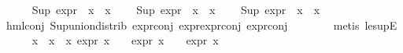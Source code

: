 \begin{isabellebody}
\ \ \ \ \isamarkupfalse%
\ {\isachardoublequoteopen}{\isacharparenleft}{\kern0pt}Sup\ {\isacharparenleft}{\kern0pt}{\isacharparenleft}{\kern0pt}expr{\isacharunderscore}{\kern0pt}{}\ {\isasymcirc}\ x{}{}{\isacharparenright}{\kern0pt}\ {\isacharbackquote}{\kern0pt}\ x{}{}{\isacharparenright}{\kern0pt}\ {\isasymle}\ {}{\isacharparenright}{\kern0pt}{\isachardoublequoteclose}\isanewline
\ \ {\isachardoublequoteopen}{\isacharparenleft}{\kern0pt}Sup\ {\isacharparenleft}{\kern0pt}{\isacharparenleft}{\kern0pt}expr{\isacharunderscore}{\kern0pt}{}\ {\isasymcirc}\ x{}{}{\isacharparenright}{\kern0pt}\ {\isacharbackquote}{\kern0pt}\ x{}{}{\isacharparenright}{\kern0pt}\ {\isasymle}\ {}{\isacharparenright}{\kern0pt}{\isachardoublequoteclose}\isanewline
\ \ {\isachardoublequoteopen}{\isacharparenleft}{\kern0pt}Sup\ {\isacharparenleft}{\kern0pt}{\isacharparenleft}{\kern0pt}expr{\isacharunderscore}{\kern0pt}{}\ {\isasymcirc}\ x{}{}{\isacharparenright}{\kern0pt}\ {\isacharbackquote}{\kern0pt}\ x{}{}{\isacharparenright}{\kern0pt}\ {\isasymle}\ {}{\isacharparenright}{\kern0pt}{\isachardoublequoteclose}\isanewline
\ \ \ \ \ \ \isamarkupfalse%
\ hml{\isacharunderscore}{\kern0pt}conj\ Sup{\isacharunderscore}{\kern0pt}union{\isacharunderscore}{\kern0pt}distrib\ expr{\isacharunderscore}{\kern0pt}{}{\isacharunderscore}{\kern0pt}conj\ expr{\isacharunderscore}{\kern0pt}{}{\isachardot}{\kern0pt}expr{\isacharunderscore}{\kern0pt}{}{\isacharunderscore}{\kern0pt}conj\ expr{\isacharunderscore}{\kern0pt}{}{\isacharunderscore}{\kern0pt}conj\isanewline
\ \ \ \ \ \ \isamarkupfalse%
\ {\isacharparenleft}{\kern0pt}metis\ le{\isacharunderscore}{\kern0pt}supE{\isacharparenright}{\kern0pt}{\isacharplus}{\kern0pt}\isanewline
\ \ \ \ \isamarkupfalse%
\ {\isachardoublequoteopen}{\isasymforall}x\ {\isasymin}\ {\isacharparenleft}{\kern0pt}x{}{}\ {\isacharbackquote}{\kern0pt}\ x{}{}{\isacharparenright}{\kern0pt}{\isachardot}{\kern0pt}\ expr{\isacharunderscore}{\kern0pt}{}\ x\ {\isasymle}\ {}\ {\isasymand}\ expr{\isacharunderscore}{\kern0pt}{}\ x\ {\isasymle}\ {}\ {\isasymand}\ expr{\isacharunderscore}{\kern0pt}{}\ x\ {\isasymle}\ {}{\isachardoublequoteclose}\isanewline

\end{isabellebody}
